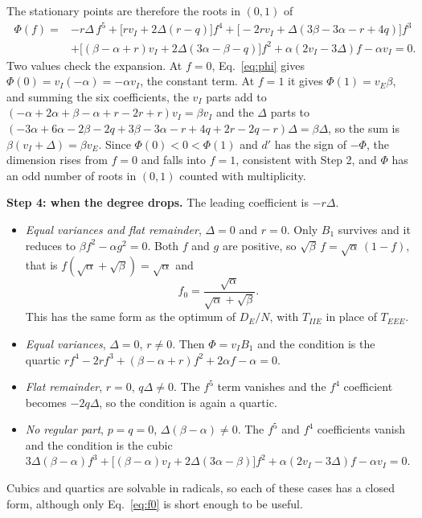 \documentclass[11pt]{article}
\begin{document}
The stationary points are therefore the roots in $(0,1)$ of
\begin{equation}
 \boxed{\;
 \begin{aligned}
 \Phi(f)={}&-r\Delta\,f^5+\bigl[rv_I+2\Delta(r-q)\bigr]f^4
   +\bigl[-2rv_I+\Delta(3\beta-3\alpha-r+4q)\bigr]f^3\\
  &+\bigl[(\beta-\alpha+r)v_I+2\Delta(3\alpha-\beta-q)\bigr]f^2
   +\alpha(2v_I-3\Delta)f-\alpha v_I=0 .
 \end{aligned}\;}
 \label{eq:quintic}
\end{equation}
Two values check the expansion. At $f=0$, Eq.~\eqref{eq:phi} gives $\Phi(0)=v_I(-\alpha)=-\alpha v_I$, the constant term. At $f=1$ it gives $\Phi(1)=v_E\beta$, and summing the six coefficients, the $v_I$ parts add to $(-\alpha+2\alpha+\beta-\alpha+r-2r+r)v_I=\beta v_I$ and the $\Delta$ parts to $(-3\alpha+6\alpha-2\beta-2q+3\beta-3\alpha-r+4q+2r-2q-r)\Delta=\beta\Delta$, so the sum is $\beta(v_I+\Delta)=\beta v_E$. Since $\Phi(0)<0<\Phi(1)$ and $d'$ has the sign of $-\Phi$, the dimension rises from $f=0$ and falls into $f=1$, consistent with Step 2, and $\Phi$ has an odd number of roots in $(0,1)$ counted with multiplicity.

\textbf{Step 4: when the degree drops.} The leading coefficient is $-r\Delta$.
\begin{itemize}
 \item \emph{Equal variances and flat remainder}, $\Delta=0$ and $r=0$. Only $B_1$ survives and it reduces to $\beta f^2-\alpha g^2=0$. Both $f$ and $g$ are positive, so $\sqrt\beta\,f=\sqrt\alpha\,(1-f)$, that is $f(\sqrt\alpha+\sqrt\beta)=\sqrt\alpha$ and
 \begin{equation}
  f_0=\frac{\sqrt\alpha}{\sqrt\alpha+\sqrt\beta}.
  \label{eq:f0}
 \end{equation}
 This has the same form as the optimum of $D_E/N$, with $T_{IIE}$ in place of $T_{EEE}$.
 \item \emph{Equal variances}, $\Delta=0$, $r\ne0$. Then $\Phi=v_IB_1$ and the condition is the quartic $rf^4-2rf^3+(\beta-\alpha+r)f^2+2\alpha f-\alpha=0$.
 \item \emph{Flat remainder}, $r=0$, $q\Delta\ne0$. The $f^5$ term vanishes and the $f^4$ coefficient becomes $-2q\Delta$, so the condition is again a quartic.
 \item \emph{No regular part}, $p=q=0$, $\Delta(\beta-\alpha)\ne0$. The $f^5$ and $f^4$ coefficients vanish and the condition is the cubic $3\Delta(\beta-\alpha)f^3+\bigl[(\beta-\alpha)v_I+2\Delta(3\alpha-\beta)\bigr]f^2+\alpha(2v_I-3\Delta)f-\alpha v_I=0$.
\end{itemize}
Cubics and quartics are solvable in radicals, so each of these cases has a closed form, although only Eq.~\eqref{eq:f0} is short enough to be useful.
\end{document}
